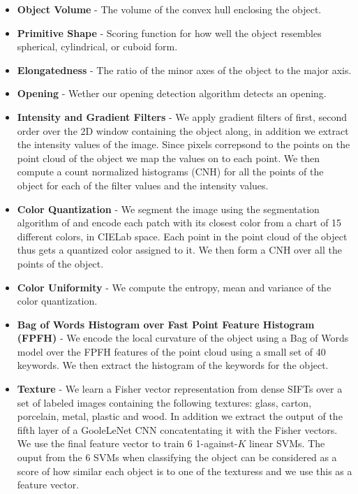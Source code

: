 \begin{itemize}
\tightlist
\item
  \textbf{Object Volume} - The volume of the convex hull enclosing the
  object.
\item
  \textbf{Primitive Shape} - Scoring function for how well the object
  resembles spherical, cylindrical, or cuboid form.
\item
  \textbf{Elongatedness} - The ratio of the minor axes of the object to
  the major axis.
\item
  \textbf{Opening} - Wether our opening detection algorithm detects an
  opening.
\item
  \textbf{Intensity and Gradient Filters} - We apply gradient filters of
  first, second order over the 2D window containing the object along, in
  addition we extract the intensity values of the image. Since pixels
  correpsond to the points on the point cloud of the object we map the
  values on to each point. We then compute a count normalized histograms
  (CNH) for all the points of the object for each of the filter values
  and the intensity values.
\item
  \textbf{Color Quantization} - We segment the image using the
  segmentation algorithm of \cite{Felzenszwalb:2004vi} and encode each
  patch with its closest color from a chart of 15 different colors, in
  CIELab space. Each point in the point cloud of the object thus gets a
  quantized color assigned to it. We then form a CNH over all the points
  of the object.\\
\item
  \textbf{Color Uniformity} - We compute the entropy, mean and variance
  of the color quantization.
\item
  \textbf{Bag of Words Histogram over Fast Point Feature Histogram
  (FPFH)} \cite{Rusu:2009hf} - We encode the local curvature of the
  object using a Bag of Words model over the FPFH features of the point
  cloud using a small set of 40 keywords. We then extract the histogram
  of the keywords for the object.
\item
  \textbf{Texture} - We learn a Fisher vector representation from dense
  SIFTs over a set of labeled images containing the following textures:
  glass, carton, porcelain, metal, plastic and wood. In addition we
  extract the output of the fifth layer of a GooleLeNet CNN
  concatentating it with the Fisher vectors. We use the final feature
  vector to train 6 1-against-\(K\) linear SVMs. The ouput from the 6
  SVMs when classifying the object can be considered as a score of how
  similar each object is to one of the texturess and we use this as a
  feature vector.
\end{itemize}
